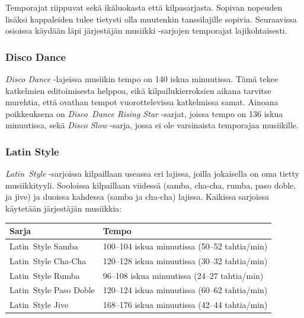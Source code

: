 \documentclass[12pt, a4paper, oneside]{article}
\begin{document}
Temporajat riippuvat sekä ikäluokasta että kilpasarjasta.
Sopivan nopeuden lisäksi kappaleiden tulee tietysti olla muutenkin tanssilajille sopivia.
Seuraavissa osioissa käydään läpi järjestäjän musiikki -sarjojen temporajat lajikohtaisesti.

\subsubsection{Disco Dance}

\textit{Disco Dance} -lajeissa musiikin tempo on 140 iskua minuutissa.
Tämä tekee katkelmien editoimisesta helppoa,
eikä kilpailukierroksien aikana tarvitse murehtia,
että ovathan tempot vuorottelevissa katkelmissa samat.
Ainoana poikkeuksena on \textit{Disco~Dance Rising Star} -sarjat,
joissa tempo on 136 iskua minuutissa,
sekä \textit{Disco Slow} -sarja,
jossa ei ole varsinaista temporajaa musiikille.

\subsubsection{Latin Style}

\textit{Latin~Style} -sarjoissa kilpaillaan useassa eri lajissa,
joilla jokaisella on oma tietty musiikkityyli.
Sooloissa kilpaillaan viidessä (samba, cha-cha, rumba, paso doble, ja jive) ja
duoissa kahdessa (samba ja cha-cha) lajissa.
Kaikissa sarjoissa käytetään järjestäjän musiikkia: \medskip

\begin{table}[ht]
    \centering
    \setlength\tabcolsep{8mm}
    \renewcommand{\arraystretch}{1.5}
    \begin{tabular}{@{\hspace{0.25cm}}ll@{\hspace{0.25cm}}}
        \toprule
        Sarja                  & Tempo                                         \\ \midrule
        Latin~Style Samba      & 100--104 iskua minuutissa (50--52 tahtia/min) \\
        Latin~Style Cha-Cha    & 120--128 iskua minuutissa (30--32 tahtia/min) \\
        Latin~Style Rumba      &  96--108 iskua minuutissa (24--27 tahtia/min) \\
        Latin~Style Paso Doble & 120--124 iskua minuutissa (60--62 tahtia/min) \\
        Latin~Style Jive       & 168--176 iskua minuutissa (42--44 tahtia/min) \\ \bottomrule
    \end{tabular}
    \label{tab:latin-bpm}
\end{table}
\end{document}
